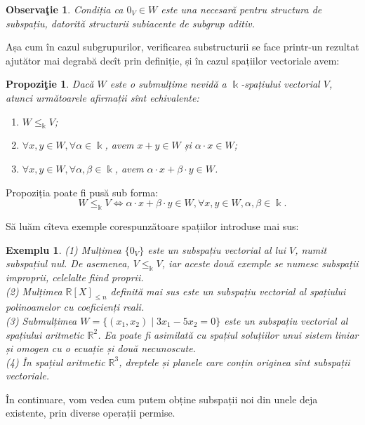\documentclass[11pt,a4paper]{article}
\theoremstyle{dotless}
\newtheorem{proposition}{Propozi\c{t}ie}[section]
\theoremstyle{dotlessdr}
\newtheorem{example}{Exemplu}[section]
\newtheorem{remark}{Observa\c{t}ie}[section]
\begin{document}
\begin{remark}
Condiția ca $0_V \in W$ este una necesară pentru structura de subspațiu, 
datorită structurii subiacente de subgrup aditiv.
\end{remark}

Așa cum în cazul subgrupurilor, verificarea substructurii se face printr-un 
rezultat ajutător mai degrabă decît prin definiție, și în cazul spațiilor 
vectoriale avem:
\begin{proposition}
Dacă $W$ este o submulțime nevidă a $\Bbbk$-spațiului vectorial $V$, atunci 
următoarele afirmații sînt echivalente:
\begin{enumerate}[(1)]
\item $W \leq_\Bbbk V$;
\item $\forall x,y \in W, \forall \alpha \in \Bbbk$, avem $x + y \in W$ și 
$\alpha \cdot x \in W$;
\item $\forall x,y \in W, \forall \alpha, \beta \in \Bbbk$, avem 
$\alpha \cdot x + \beta \cdot y \in W$.
\end{enumerate}
\end{proposition}

Propoziția poate fi pusă sub forma: 
\[
W \leq_\Bbbk V \Longleftrightarrow \alpha \cdot x + \beta \cdot y \in W, 
\forall x,y \in W, \alpha, \beta \in \Bbbk.
\]

Să luăm cîteva exemple corespunzătoare spațiilor introduse mai sus:
\begin{example}
(1) Mulțimea $\{0_V\}$ este un subspațiu vectorial al lui $V$, numit 
\emph{subspațiul nul}. De asemenea, $V \leq_\Bbbk V$, iar aceste două exemple 
se numesc \emph{subspații improprii}, celelalte fiind \emph{proprii}. \\

(2) Mulțimea $\mathbb{R}[X]_{\leq n}$ definită mai sus este un subspațiu 
vectorial al spațiului polinoamelor cu coeficienți reali. \\

(3) Submulțimea $W = \{ (x_1, x_2) \mid 3x_1 - 5x_2 = 0 \}$ este un subspațiu 
vectorial al spațiului aritmetic $\mathbb{R}^2$. Ea poate fi asimilată cu 
spațiul soluțiilor unui sistem liniar și omogen cu o ecuație și două 
necunoscute. \\

(4) În spațiul aritmetic $\mathbb{R}^3$, dreptele și planele care conțin 
originea sînt subspații vectoriale.
\end{example}

În continuare, vom vedea cum putem obține subspații noi din unele deja 
existente, prin diverse operații permise.
\end{document}
